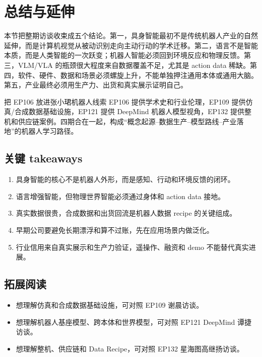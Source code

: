 \section{总结与延伸}

本节把整期访谈收束成五个结论。第一，具身智能最初不是传统机器人产业的自然延伸，而是计算机视觉从被动识别走向主动行动的学术迁移。第二，语言不是智能本质，而是人类智能的一次跃变；机器人智能必须回到环境反应和物理反馈。第三，VLM/VLA 的瓶颈很大程度来自数据覆盖不足，尤其是 action data 稀缺。第四，软件、硬件、数据和场景必须螺旋上升，不能单独押注通用本体或通用大脑。第五，产业最终必须用生产力、出货和真实展示证明自己。

\begin{importantbox}{把 EP106 放进张小珺机器人线索}
EP106 提供学术史和行业伦理，EP109 提供仿真/合成数据基础设施，EP121 提供 DeepMind 机器人模型视角，EP132 提供整机和供应链案例。四期合在一起，构成“概念起源--数据生产--模型路线--产业落地”的机器人学习路径。
\end{importantbox}

\subsection{关键 takeaways}

\begin{enumerate}
\item 具身智能的核心不是机器人外形，而是感知、行动和环境反馈的闭环。
\item 语言增强智能，但物理世界智能必须通过身体和 action data 接地。
\item 真实数据很贵，合成数据和出货回流是机器人数据 recipe 的关键组成。
\item 早期公司要避免长期漂浮和算不过账，先在应用场景内做泛化。
\item 行业信用来自真实展示和生产力验证，遥操作、融资和 demo 不能替代真实进展。
\end{enumerate}

\subsection{拓展阅读}

\begin{itemize}
\item 想理解仿真和合成数据基础设施，可对照 EP109 谢晨访谈。
\item 想理解机器人基座模型、跨本体和世界模型，可对照 EP121 DeepMind 谭捷访谈。
\item 想理解整机、供应链和 Data Recipe，可对照 EP132 星海图高继扬访谈。
\end{itemize}


